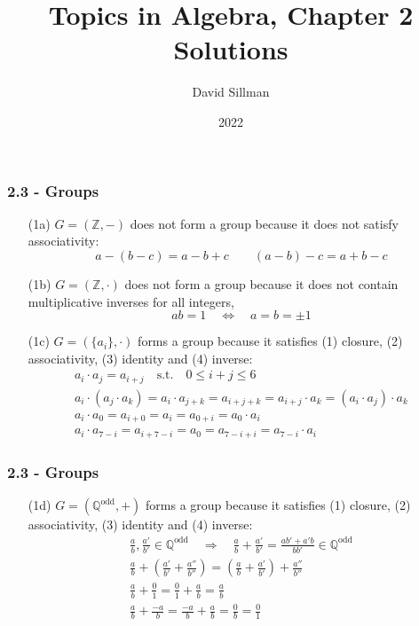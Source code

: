 \documentclass{beamer}
\title{Topics in Algebra, Chapter 2 Solutions}
\author{David Sillman}
\date{2022}
\begin{document}
\frame{\titlepage}

\begin{frame}
\frametitle{2.3 - Groups}
\small
\begin{enumerate}
	\item[(1a)] $G = (\mathbb Z, -)$ does not form a group because it does not satisfy associativity:
	\begin{equation*}
	a-(b-c) = a-b+c\qquad (a-b)-c = a+b-c
	\end{equation*}
	\item[(1b)] $G = (\mathbb Z, \cdot)$ does not form a group because it does not contain multiplicative inverses for all integers,
	\begin{equation*}
	ab = 1\quad\Leftrightarrow\quad a=b=\pm 1
	\end{equation*}
	\item[(1c)] $G = (\{a_i\}, \cdot)$ forms a group because it satisfies (1) closure, (2) associativity, (3) identity and (4) inverse:
	\begin{gather}
	a_i\cdot a_j = a_{i+j}\quad\text{s.t.}\quad 0\leq i+j\leq 6\\
	a_i\cdot(a_j\cdot a_k) = a_i \cdot a_{j+k} = a_{i+j+k} = a_{i+j}\cdot a_{k}= (a_i\cdot a_j)\cdot a_k\\
	a_i\cdot a_0 = a_{i+0} = a_i = a_{0+i} = a_0\cdot a_i\\
	a_i\cdot a_{7-i} = a_{i+7-i} = a_0 = a_{7-i+i} = a_{7-i}\cdot a_i
	\end{gather}
\end{enumerate}
\end{frame}
\begin{frame}
\frametitle{2.3 - Groups}
\small
\begin{enumerate}
	\setcounter{equation}{0}
	\item[(1d)] $G = (\mathbb Q^{\text{odd}}, +)$ forms a group because it satisfies (1) closure, (2) associativity, (3) identity and (4) inverse:
	\begin{gather}
	\frac{a}{b},\frac{a'}{b'}\in\mathbb Q^{\text{odd}}\quad\Rightarrow\quad\frac{a}{b}+\frac{a'}{b'} = \frac{ab' + a'b}{bb'}\in\mathbb Q^{\text{odd}} \\
	\frac{a}{b} + \left(\frac{a'}{b'} + \frac{a''}{b''}\right) = \left(\frac{a}{b}+\frac{a'}{b'}\right)+\frac{a''}{b''} \\
	\frac{a}{b} + \frac{0}{1} = \frac{0}{1} + \frac{a}{b} = \frac{a}{b} \\
	\frac{a}{b} + \frac{-a}{b} = \frac{-a}{b} + \frac{a}{b} = \frac{0}{b} = \frac{0}{1}
	\end{gather}
\end{enumerate}
\end{frame}
\end{document}
